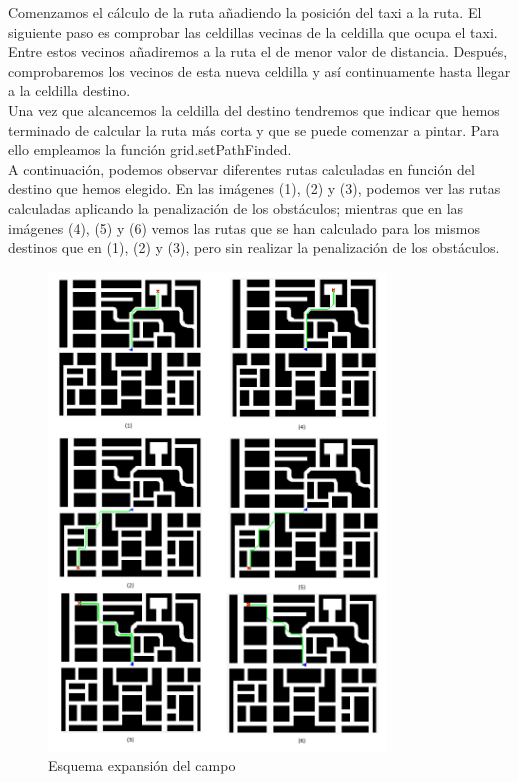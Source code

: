 Comenzamos el cálculo de la ruta añadiendo la posición del taxi a la ruta. El siguiente paso es comprobar las celdillas vecinas de la celdilla que ocupa el taxi. Entre estos vecinos añadiremos a la ruta el de menor valor de distancia. Después, comprobaremos los vecinos de esta nueva celdilla y así continuamente hasta llegar a la celdilla destino.\\

Una vez que alcancemos la celdilla del destino tendremos que indicar que hemos terminado de calcular la ruta más corta y que se puede comenzar a pintar. Para ello empleamos la función grid.setPathFinded.\\

A continuación, podemos observar diferentes rutas calculadas en función del destino que hemos elegido. En las imágenes (1), (2) y (3), podemos ver las rutas calculadas aplicando la penalización de los obstáculos; mientras que en las imágenes (4), (5) y (6) vemos las rutas que se han calculado para los mismos destinos que en (1), (2) y (3), pero sin realizar la penalización de los obstáculos.\\

\begin{figure}[H]
  \begin{center}
    \includegraphics[width=0.8\textwidth]{figures/GPP/rutas.png}
		\caption{Esquema expansión del campo}
		\label{fig.rutas_gpp}
		\end{center}
\end{figure}

